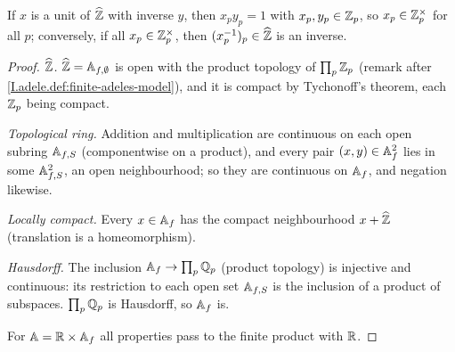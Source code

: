 \begin{definition}
\end{definition}
\noindent If $x$ is a unit of $\widehat{\mathbb{Z}}$ with inverse $y$, then $x_py_p=1$ with $x_p,y_p\in\mathbb{Z}_p$, so
$x_p\in\mathbb{Z}_p^\times$ for all $p$; conversely, if all $x_p\in\mathbb{Z}_p^\times$, then $(x_p^{-1})_p\in\widehat{\mathbb{Z}}$ is an inverse.

\begin{definition}[adeles]
\end{definition}

\begin{theorem}
\end{theorem}
\begin{proof}
\emph{$\widehat{\mathbb{Z}}$.} $\widehat{\mathbb{Z}}=\mathbb{A}_{f,\emptyset}$ is open with the product topology of $\prod_p\mathbb{Z}_p$ (remark after
\cref{I.adele.def:finite-adeles-model}), and it is compact by Tychonoff's theorem, each $\mathbb{Z}_p$ being compact.

\emph{Topological ring.} Addition and multiplication are continuous on each open subring $\mathbb{A}_{f,S}$ (componentwise
on a product), and every pair $(x,y)\in\mathbb{A}_f^2$ lies in some $\mathbb{A}_{f,S}^2$, an open neighbourhood; so they are continuous on
$\mathbb{A}_f$, and negation likewise.

\emph{Locally compact.} Every $x\in\mathbb{A}_f$ has the compact neighbourhood $x+\widehat{\mathbb{Z}}$ (translation is a homeomorphism).

\emph{Hausdorff.} The inclusion $\mathbb{A}_f\to\prod_p\mathbb{Q}_p$ (product topology) is injective and continuous: its restriction to
each open set $\mathbb{A}_{f,S}$ is the inclusion of a product of subspaces. $\prod_p\mathbb{Q}_p$ is Hausdorff, so $\mathbb{A}_f$ is.

For $\mathbb{A}=\mathbb{R}\times\mathbb{A}_f$ all properties pass to the finite product with $\mathbb{R}$.
\end{proof}

